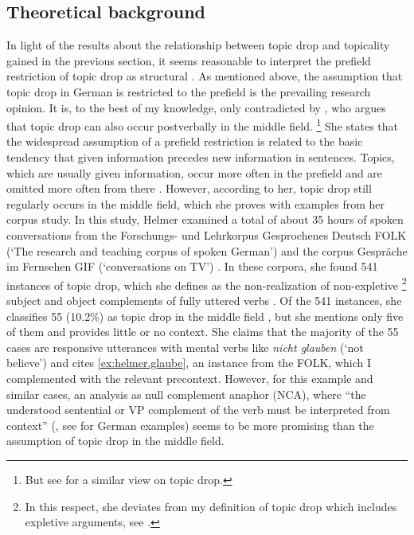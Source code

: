 \subsection{Theoretical background}\label{sec:prefield.detail.theory}
In light of the results about the relationship between topic drop and topicality gained in the previous section, it seems reasonable to  interpret the prefield restriction of topic drop as structural \citep[1850]{reich2011}.
As mentioned above, the assumption that topic drop in German is restricted to the prefield is the prevailing research opinion.
It is, to the best of my knowledge, only contradicted by \citet{helmer2016}, who argues that topic drop can also occur postverbally in the middle field.%
\footnote{But see \citet[10]{nygard2018} for a similar view on  topic drop.}
%
She states that the widespread assumption of a prefield restriction is related to the basic tendency that given  information precedes new information in sentences.
Topics, which are usually given  information, occur more often in the prefield and are omitted more often from there \citep[26--27]{helmer2016}.
However, according to her, topic drop still regularly occurs in the middle field,  which she proves with examples from her corpus study. 
In this study, Helmer examined a total of about 35 hours of spoken conversations from
the Forschungs- und Lehrkorpus Gesprochenes Deutsch FOLK (`The research and teaching corpus of spoken German') \citep{schmidt2014} and the corpus Gespräche im Fernsehen GIF (`conversations on TV') \citep[65]{helmer2016}.
In these corpora, she found 541 instances of topic drop, which she defines as the non-realization of non-expletive%
\footnote{In this respect, she deviates from my definition of topic drop which includes expletive  arguments, see .}
%
subject and object complements of fully uttered verbs \citep[70]{helmer2016}.
Of the 541 instances, she classifies 55 (10.2\%) as topic drop in the middle field \citep[214]{helmer2016}, but she mentions only five of them and provides little or no context.
She claims that the majority of the 55 cases are responsive utterances with mental verbs like \textit{nicht glauben} (`not believe') \citep[214]{helmer2016} and cites \ref{ex:helmer.glaube}, an instance from the FOLK,  which I complemented with the relevant precontext.
However, for this example and similar cases, an analysis as null complement anaphor (NCA), where ``the understood sentential or VP complement of the verb must be interpreted from context'' (\cite[411]{hankamer.sag1976}, see \cite[778]{klein1993} for German examples) seems to be more promising than the assumption of topic drop in the middle field.

